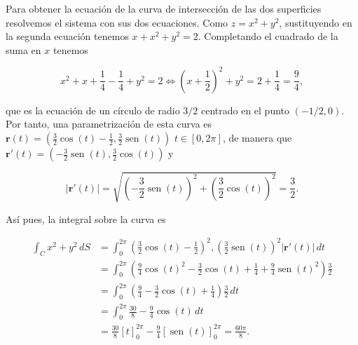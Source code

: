 \documentclass[
  spanish,
  a4paper,
]{scrreport}
\theoremstyle{definition}
\theoremstyle{remark}
\begin{document}
\begin{tcolorbox}[enhanced jigsaw, arc=.35mm, bottomrule=.15mm, bottomtitle=1mm, breakable, colback=white, colbacktitle=quarto-callout-tip-color!10!white, colframe=quarto-callout-tip-color-frame, coltitle=black, left=2mm, leftrule=.75mm, opacityback=0, opacitybacktitle=0.6, rightrule=.15mm, title=\textcolor{quarto-callout-tip-color}{\faLightbulb}\hspace{0.5em}{Solución}, titlerule=0mm, toprule=.15mm, toptitle=1mm]

Para obtener la ecuación de la curva de intersección de las dos
superficies resolvemos el sistema con sus dos ecuaciones. Como
\(z=x^2+y^2\), sustituyendo en la segunda ecuación tenemos
\(x + x^2 + y^2 = 2\). Completando el cuadrado de la suma en \(x\)
tenemos

\[
x^2 + x + \frac{1}{4} - \frac{1}{4} + y^2 = 2
\Leftrightarrow \left(x + \frac{1}{2}\right)^2 + y^2 = 2 + \frac{1}{4} = \frac{9}{4},
\]

que es la ecuación de un círculo de radio \(3/2\) centrado en el punto
\((-1/2, 0)\). Por tanto, una parametrización de esta curva es
\(\mathbf{r}(t) = \left(\frac{3}{2}\cos(t)-\frac{1}{2}, \frac{3}{2}\operatorname{sen}(t)\right)\)
\(t\in [0,2\pi]\), de manera que
\(\mathbf{r}'(t) = \left(-\frac{3}{2}\operatorname{sen}(t), \frac{3}{2}\cos(t)\right)\)
y

\[
|\mathbf{r}'(t)| 
= \sqrt{\left(-\frac{3}{2}\operatorname{sen}(t)\right)^2 + \left(\frac{3}{2}\cos(t)\right)^2} 
= \frac{3}{2}.
\]

Así pues, la integral sobre la curva es

\begin{align*}
\int_C x^2 + y^2\, dS
&= \int_0^{2\pi} \left(\frac{3}{2}\cos(t)-\frac{1}{2}\right)^2, \left(\frac{3}{2}\operatorname{sen}(t)\right)^2 |\mathbf{r}'(t)|\, dt \\
&= \int_0^{2\pi} \left(\frac{9}{4}\cos(t)^2 - \frac{3}{2}\cos(t) + \frac{1}{4} + \frac{9}{4}\operatorname{sen}(t)^2 \right)  \frac{3}{2} \\
&= \int_0^{2\pi} \left(\frac{9}{4} - \frac{3}{2}\cos(t) + \frac{1}{4} \right)\frac{3}{2} \, dt \\
&= \int_0^{2\pi} \frac{30}{8} - \frac{9}{4}\cos(t) \, dt \\
&= \frac{30}{8}[t]_0^{2\pi} - \frac{9}{4}[\operatorname{sen}(t)]_0^{2\pi}
= \frac{60\pi}{8}.
\end{align*}

\end{tcolorbox}
\end{document}
